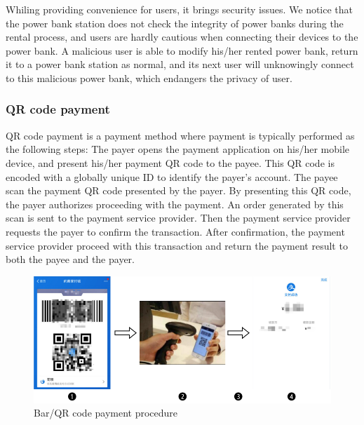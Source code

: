 

Whiling providing convenience for users, it brings security issues. We notice that the power bank station does not check the integrity of power banks during the rental process, and users are hardly cautious when connecting their devices to the power bank. A malicious user is able to modify his/her rented power bank, return it to a power bank station as normal, and its next user will unknowingly connect to this malicious power bank, which endangers the privacy of user.

\subsubsection{QR code payment}

QR code payment is a payment method where payment is typically performed as the following steps:
 The payer opens the payment application on his/her mobile device, and present his/her payment QR code to the payee. This QR code is encoded with a globally unique ID to identify the payer's account. 
 The payee scan the payment QR code presented by the payer. By presenting this QR code, the payer authorizes proceeding with the payment.
 An order generated by this scan is sent to the payment service provider. Then the payment service provider requests the payer to confirm the transaction.
 After confirmation, the payment service provider proceed with this transaction and return the payment result to both the payee and the payer.


\begin{figure}[hbtp]
	\centering
	\includegraphics[width=\linewidth]{./Figs/qr_code_payment.png}
	\caption{Bar/QR code payment procedure}
	\label{fig:qr_payment_procedure}
\end{figure}


